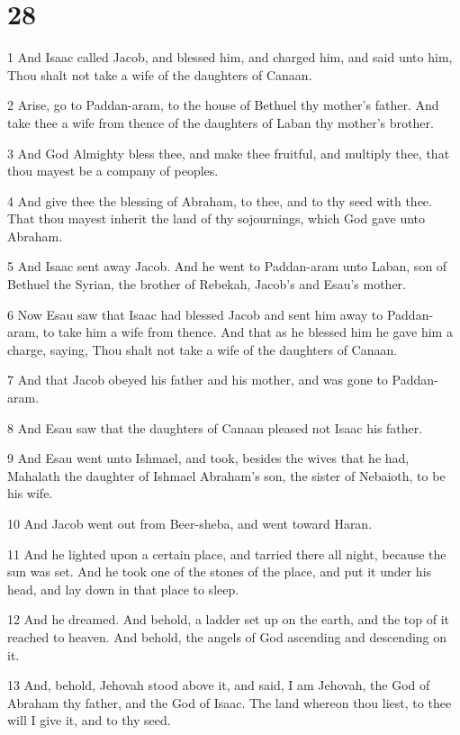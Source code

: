 \chapter{28}

\par 1 And Isaac called Jacob, and blessed him, and charged him, and said unto him, Thou shalt not take a wife of the daughters of Canaan.
\par 2 Arise, go to Paddan-aram, to the house of Bethuel thy mother's father. And take thee a wife from thence of the daughters of Laban thy mother's brother.
\par 3 And God Almighty bless thee, and make thee fruitful, and multiply thee, that thou mayest be a company of peoples.
\par 4 And give thee the blessing of Abraham, to thee, and to thy seed with thee. That thou mayest inherit the land of thy sojournings, which God gave unto Abraham.
\par 5 And Isaac sent away Jacob. And he went to Paddan-aram unto Laban, son of Bethuel the Syrian, the brother of Rebekah, Jacob's and Esau's mother.
\par 6 Now Esau saw that Isaac had blessed Jacob and sent him away to Paddan-aram, to take him a wife from thence. And that as he blessed him he gave him a charge, saying, Thou shalt not take a wife of the daughters of Canaan.
\par 7 And that Jacob obeyed his father and his mother, and was gone to Paddan-aram.
\par 8 And Esau saw that the daughters of Canaan pleased not Isaac his father.
\par 9 And Esau went unto Ishmael, and took, besides the wives that he had, Mahalath the daughter of Ishmael Abraham's son, the sister of Nebaioth, to be his wife.
\par 10 And Jacob went out from Beer-sheba, and went toward Haran.
\par 11 And he lighted upon a certain place, and tarried there all night, because the sun was set. And he took one of the stones of the place, and put it under his head, and lay down in that place to sleep.
\par 12 And he dreamed. And behold, a ladder set up on the earth, and the top of it reached to heaven. And behold, the angels of God ascending and descending on it.
\par 13 And, behold, Jehovah stood above it, and said, I am Jehovah, the God of Abraham thy father, and the God of Isaac. The land whereon thou liest, to thee will I give it, and to thy seed.
